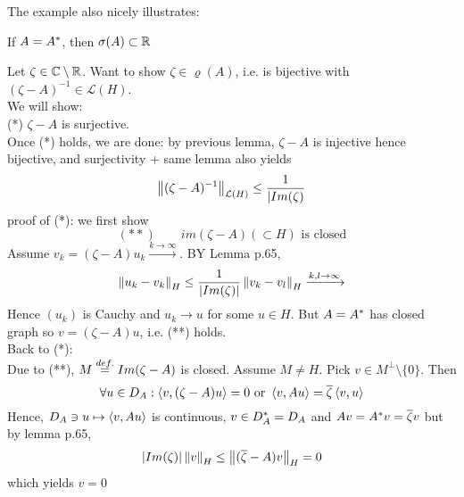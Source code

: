 The example also nicely illustrates:
\begin{proposition}\nl
	If $A={A}^*$, then $\sigma(A)\subset \mathbb{R}$
	\begin{pf}{}{}
		Let $\zeta\in\mathbb{C}\setminus\mathbb{R}$. Want to show $\zeta\in\varrho(A)$, i.e.  is bijective with $(\zeta-A)^{-1}\in\mathcal{L}(H)$.\\
		We will show:\\
		(*) $\zeta-A$ is surjective.\\
		Once  (*) holds, we are done: by previous lemma, $\zeta-A$ is injective hence bijective, and surjectivity + same lemma also yields
		$$
			\left\|{(\zeta-A)^{-1}}\right\|_{\mathcal{L}(H)}\leq\frac{1}{|Im(\zeta)}
		$$
		proof of (*): we first show
		$$
			(**)\qquad im(\zeta-A)(\subset H) \text{  is closed}
		$$
		Assume $v_k=(\zeta-A)u_k\xrightarrow{k\to\infty}$. BY Lemma p.65,
		$$
			\left\|{u_k-v_k}\right\|_H\leq\frac{1}{|Im(\zeta)|}\left\|{v_k-v_l}\right\|_H\xrightarrow{k,l\to\infty}$$Hence $(u_k)$ is Cauchy and $u_k\to u$ for some $u\in H$. But $A={A}^*$ has closed graph so $v=(\zeta-A)u$, i.e. (**) holds.\\
		Back to (*):\\
		Due to (**), $M\stackrel{def.}{=} Im(\zeta-A)$ is closed. Assume $M\neq H$. Pick $v\in M^\perp\setminus\{0\}$. Then
		$$
			\forall u\in D_A:\left<{v},{(\zeta-A)u}\right>=0\text{  or  }\left<{v},{Au}\right>=\overline{\zeta}\left<{v},{u}\right>$$
		Hence,
		$
			D_A\ni u\mapsto \left<{v},{Au}\right>
		$
		is continuous, $v\in D_{A}^*=D_A$ and $Av={A}^*v=\overline{\zeta}v$
		but by lemma p.65,
		$$|Im(\zeta)|\left\|{v}\right\|_H\leq\left\|{(\overline{\zeta}-A)v}\right\|_H=0$$
		which yields $v=0 $
	\end{pf}
\end{proposition}
